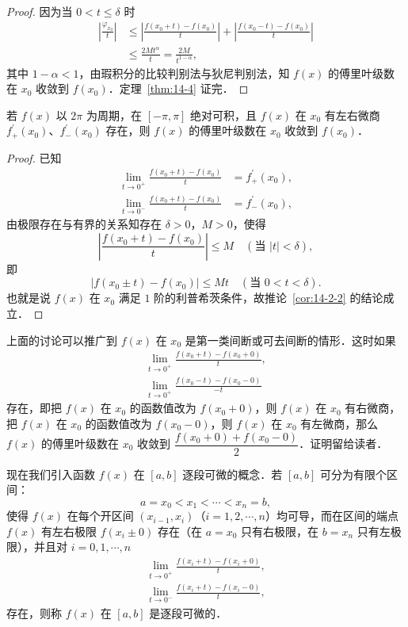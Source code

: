 \begin{proof}
因为当 $0<t\leqslant\delta$ 时
\[
\begin{aligned}
\left|\frac{\varphi_{x_{0}}}{t}\right|&\leqslant\left|\frac{f(x_{0}+t)-f(x_{0})}{t}\right|+\left|\frac{f(x_{0}-t)-f(x_{0})}{t}\right|\\
&\leqslant\frac{2Mt^{\alpha}}{t}=\frac{2M}{t^{1-\alpha}},
\end{aligned}
\]
其中 $1-\alpha<1$，由瑕积分的比较判别法与狄尼判别法，知 $f(x)$ 的傅里叶级数在 $x_{0}$ 收敛到 $f(x_{0})$．定理~\ref{thm:14-4} 证完．
\end{proof}

\setcounter{corollary}{0}
\begin{corollary}\label{cor:14-2-2}
若 $f(x)$ 以 $2\pi$ 为周期，在 $[-\pi,\pi]$ 绝对可积，且 $f(x)$ 在 $x_{0}$ 有左右微商 $f_{+}^{\prime}(x_{0})$、$f_{-}^{\prime}(x_{0})$ 存在，则 $f(x)$ 的傅里叶级数在 $x_{0}$ 收敛到 $f(x_{0})$．
\end{corollary}

\begin{proof}
已知
\[
\begin{aligned}
\lim_{t\to 0^{+}}\frac{f(x_{0}+t)-f(x_{0})}{t}&=f_{+}^{\prime}(x_{0}),\\
\lim_{t\to 0^{-}}\frac{f(x_{0}+t)-f(x_{0})}{t}&=f_{-}^{\prime}(x_{0}),
\end{aligned}
\]
由极限存在与有界的关系知存在 $\delta>0$，$M>0$，使得
\[
\left|\frac{f(x_{0}+t)-f(x_{0})}{t}\right|\leqslant M\quad(\text{当 }\left|t\right|<\delta),
\]
即
\[
\left|f(x_{0}\pm t)-f(x_{0})\right|\leqslant Mt\quad(\text{当 }0<t<\delta).
\]
也就是说 $f(x)$ 在 $x_{0}$ 满足 $1$ 阶的利普希茨条件，故推论~\ref{cor:14-2-2} 的结论成立．
\end{proof}

上面的讨论可以推广到 $f(x)$ 在 $x_{0}$ 是第一类间断或可去间断的情形．这时如果
\[
\begin{aligned}
\lim_{t\to 0^{+}}\frac{f(x_{0}+t)-f(x_{0}+0)}{t},\\
\lim_{t\to 0^{+}}\frac{f(x_{0}-t)-f(x_{0}-0)}{-t}
\end{aligned}
\]
存在，即把 $f(x)$ 在 $x_{0}$ 的函数值改为 $f(x_{0}+0)$，则 $f(x)$ 在 $x_{0}$ 有右微商，把 $f(x)$ 在 $x_{0}$ 的函数值改为 $f(x_{0}-0)$，则 $f(x)$ 在 $x_{0}$ 有左微商，那么 $f(x)$ 的傅里叶级数在 $x_{0}$ 收敛到 $\dfrac{f(x_{0}+0)+f(x_{0}-0)}{2}$．证明留给读者．

现在我们引入函数 $f(x)$ 在 $[a,b]$ 逐段可微的概念．若 $[a,b]$ 可分为有限个区间：
\[
a=x_{0}<x_{1}<\cdots<x_{n}=b,
\]
使得 $f(x)$ 在每个开区间 $(x_{i-1},x_{i})$（$i=1,2,\cdots,n$）均可导，而在区间的端点 $f(x)$ 有左右极限 $f(x_{i}\pm 0)$ 存在（在 $a=x_{0}$ 只有右极限，在 $b=x_{n}$ 只有左极限），并且对 $i=0,1,\cdots,n$
\[
\begin{aligned}
\lim_{t\to 0^{+}}\frac{f(x_{i}+t)-f(x_{i}+0)}{t},\\
\lim_{t\to 0^{-}}\frac{f(x_{i}+t)-f(x_{i}-0)}{t},
\end{aligned}
\]
存在，则称 $f(x)$ 在 $[a,b]$ 是逐段可微的．

